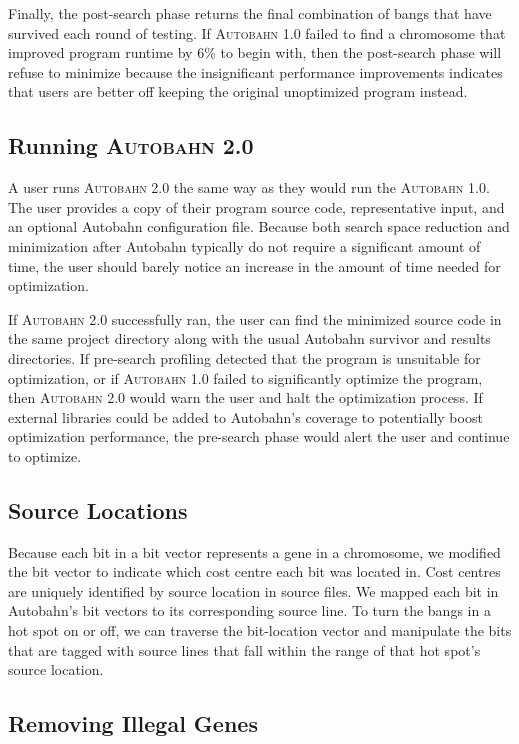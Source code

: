 \documentclass[format=sigplan, review=true]{acmart}
\newcommand{\hotspot}[0]{hot spot}
\newcommand{\Ao}[0]{\textsc{Autobahn 1.0}}
\newcommand{\At}[0]{\textsc{Autobahn 2.0}}
\newcommand{\preopt}[0]{pre-search}
\newcommand{\postopt}[0]{post-search}
\begin{document}
Finally, the \postopt{} phase returns the final combination of bangs that have survived each round of testing. If \Ao{} failed to find a chromosome that improved program runtime by 6\% to begin with, then the \postopt{} phase will refuse to minimize because the insignificant performance improvements indicates that users are better off keeping the original unoptimized program instead.


\subsection{Running \At{}}

A user runs \At{} the same way as they would run the \Ao{}. The user provides a copy of their program source code, representative input, and an optional Autobahn configuration file. Because both search space reduction and minimization after Autobahn typically do not require a significant amount of time, the user should barely notice an increase in the amount of time needed for optimization. 

If \At{} successfully ran, the user can find the minimized source code in the same project directory along with the usual Autobahn survivor and results directories. If \preopt{} profiling detected that the program is unsuitable for optimization, or if \Ao{} failed to significantly optimize the program, then \At{} would warn the user and halt the optimization process. If external libraries could be added to Autobahn's coverage to potentially boost optimization performance, the \preopt{} phase would alert the user and continue to optimize.

\subsection{Source Locations}

Because each bit in a bit vector represents a gene in a chromosome, we modified the bit vector to indicate which cost centre each bit was located in. 
Cost centres are uniquely identified by source location in source files. We mapped each bit in Autobahn's bit vectors to its corresponding source line. To turn the bangs in a \hotspot{} on or off, we can traverse the bit-location vector and manipulate the bits that are tagged with source lines that fall within the range of that \hotspot{}'s source location.

\subsection{Removing Illegal Genes}
\end{document}
